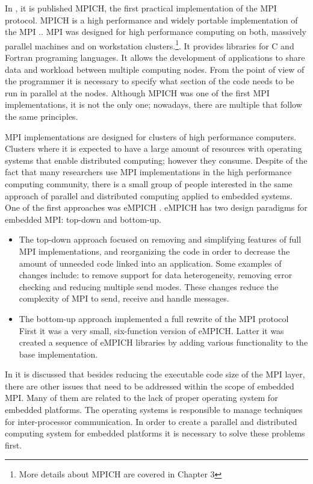 
In \cite{Salim}, it is published MPICH,  the first practical implementation of
the MPI protocol. MPICH is a high performance and widely portable
implementation of the MPI .\cite{Gropp}. MPI was designed for high performance
computing on both, massively parallel machines and on workstation
clusters.\footnote{More details about MPICH are covered in Chapter 3}. It
provides libraries for C and Fortran programing languages. It allows the
development of applications to share data and workload between multiple
computing nodes. From the point of view of the programmer it is necessary to
specify what section of the code needs to be run in parallel at the nodes.
Although MPICH was one of the first MPI implementations, it is not the only
one; nowadays, there are multiple that follow the same principles.


MPI implementations are designed for clusters of high performance computers.
Clusters where it is expected to have a large amount of resources with
operating systems that enable distributed computing; however they consume.
Despite of the fact that many researchers use MPI implementations in the high
performance computing community, there is a small group of people interested in
the same approach of parallel and distributed computing applied to embedded
systems. One of the first approaches was eMPICH \cite{McMahon}. eMPICH has two
design paradigms for embedded MPI: top-down and bottom-up.

\begin{itemize} 
\item The top-down approach focused on removing and simplifying
features of full MPI implementations, and reorganizing the code in order to
decrease the amount of unneeded code linked into an application. Some examples
of changes include: to remove support for data heterogeneity, removing error
checking and reducing multiple send modes. These changes reduce the complexity
of MPI to send, receive and handle messages.

\item The bottom-up approach implemented a full rewrite of the MPI protocol
First it was a very small, six-function version of eMPICH. Latter it was
created a sequence of eMPICH libraries by adding various functionality to the
base implementation.  
\end{itemize}

In \cite{McMahon} it is discussed that besides reducing the executable code
size of the MPI layer, there are other issues that need to be addressed within
the scope of embedded MPI. Many of them are related to the lack of proper
operating system for embedded platforms. The operating systems is responsible
to manage techniques for inter-processor communication. In order to create a
parallel and distributed computing system for embedded platforms it is
necessary to solve these problems first.


